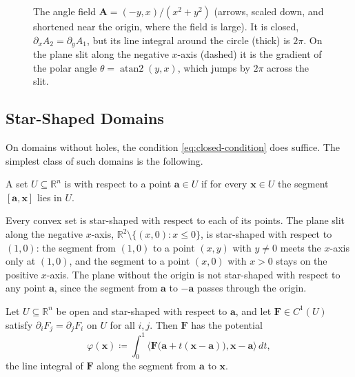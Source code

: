\begin{figure}
{}{The angle field $\mathbf A=(-y,x)/(x^2+y^2)$ (arrows, scaled down, and shortened near the origin, where the field is large). It is closed, $\partial_xA_2=\partial_yA_1$, but its line integral around the circle (thick) is $2\pi$. On the plane slit along the negative $x$-axis (dashed) it is the gradient of the polar angle $\theta=\operatorname{atan2}(y,x)$, which jumps by $2\pi$ across the slit.\label{fig:angle-field}}
\end{figure}

\subsection{Star-Shaped Domains}

On domains without holes, the condition \eqref{eq:closed-condition} does suffice. The simplest class of such domains is the following.

\begin{definition}
\label{def:star-shaped}
A set $U\subseteq\mathbb R^n$ is  with respect to a point $\mathbf a\in U$ if for every $\mathbf x\in U$ the segment $[\mathbf a,\mathbf x]$ lies in $U$.
\end{definition}

Every convex set is star-shaped with respect to each of its points. The plane slit along the negative $x$-axis, $\mathbb R^2\setminus\{(x,0): x\le0\}$, is star-shaped with respect to $(1,0)$: the segment from $(1,0)$ to a point $(x,y)$ with $y\ne0$ meets the $x$-axis only at $(1,0)$, and the segment to a point $(x,0)$ with $x>0$ stays on the positive $x$-axis. The plane without the origin is not star-shaped with respect to any point $\mathbf a$, since the segment from $\mathbf a$ to $-\mathbf a$ passes through the origin.

\begin{theorem}
\label{thm:poincare-lemma}
Let $U\subseteq\mathbb R^n$ be open and star-shaped with respect to $\mathbf a$, and let $\mathbf F\in C^1(U)$ satisfy $\partial_iF_j=\partial_jF_i$ on $U$ for all $i,j$. Then $\mathbf F$ has the potential
\[
\varphi(\mathbf x)\coloneqq\int_0^1\bigl\langle\mathbf F\bigl(\mathbf a+t(\mathbf x-\mathbf a)\bigr),\mathbf x-\mathbf a\bigr\rangle\,dt ,
\]
the line integral of $\mathbf F$ along the segment from $\mathbf a$ to $\mathbf x$.
\end{theorem}

